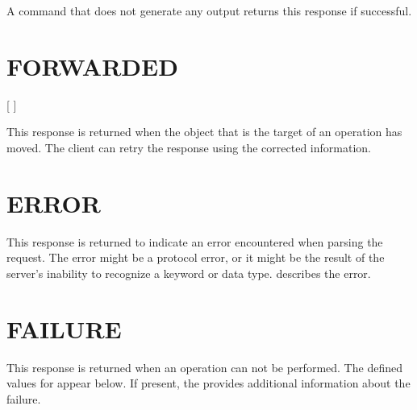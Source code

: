 A command that does not generate any output returns this response if
successful.

\section{FORWARDED}

\begin{command}
\commandsize
\protect{} \protect{} \protect{}
	\protect{} \protect{}
	\protect{} 	 [   ] \\
	\protect\zoms \protect{} \protect{} \protect{}\protect\zome
\end{command}

This response is returned when the object that is the target of an
operation has moved.  The client can retry the response using the
corrected information.

\section{ERROR}

\begin{command}
\commandsize
\protect{} \protect{}
\end{command}

This response is returned to indicate an error encountered when
parsing the request.  The error might be a protocol error, or it might
be the result of the server's inability to recognize a keyword or data
type.  describes the error.

\section{FAILURE}

\begin{command}
\commandsize
\protect{} \protect{}
	\zoos\protect{} \zooe
\end{command}

This response is returned when an operation can not be performed.  The
defined values for  appear below.
If present, the  provides additional information
about the failure.

